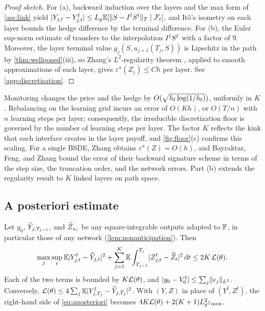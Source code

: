 \begin{proof}[Proof sketch]
For (a), backward induction over the layers and the max form of \cref{ass:link} yield $\lvert Y_{j,t}-Y^{\mathrm f}_{j,t}\rvert\le L_g\mathbb{E}[\lVert S-I^{\mathrm f} S^{\mathrm f}\rVert_T\mid\mathcal{F}_t]$, and It\^o's isometry on each layer bounds the hedge difference by the terminal difference. For (b), the Euler sup-norm estimate of \cite[Thm.~4.2]{zhang2004} transfers to the interpolation $I^{\mathrm f} S^{\mathrm f}$ with a factor of $9$. Moreover, the layer terminal value $g_j(S,u_{j+1}(T_j,S))$ is Lipschitz in the path by \cref{thm:wellposed}(iii), so Zhang's $L^2$-regularity theorem \cite{zhang2004}, applied to smooth approximations of each layer, gives $\varepsilon^\pi(Z_j)\le Ch$ per layer. See \cref{app:discretisation}.
\end{proof}

\begin{remark}\label{rem:discretisation}
Monitoring changes the price and the hedge by $O(\sqrt{h_{\mathrm f}\log(1/h_{\mathrm f})})$, uniformly in $K$. Rebalancing on the learning grid incurs an error of $O(Kh)$, or $O(T/n)$ with $n$ learning steps per layer; consequently, the irreducible discretization floor is governed by the number of learning steps per layer. The factor $K$ reflects the kink that each interface creates in the layer payoff, and \cref{fig:floor}(c) confirms this scaling. For a single BSDE, Zhang \cite{zhang2004} obtains $\varepsilon^\pi(Z)=O(h)$, and Bayraktar, Feng, and Zhang \cite{bayraktar2024} bound the error of their backward signature scheme in terms of the step size, the truncation order, and the network errors. Part (b) extends the regularity result to $K$ linked layers on path space.
\end{remark}

\subsection{A posteriori estimate}\label{sec:aposteriori}

\begin{theorem}\label{thm:aposteriori}
Let $y_0$, $\widehat Y_{j,T_{j-1}}$, and $\widehat Z_{u_i}$ be any square-integrable outputs adapted to $\mathbb{F}$, in particular those of any network (\cref{lem:nonanticipation}). Then
\begin{equation}\label{eq:aposteriori}
\max_j\sup_{t}\mathbb{E}\lvert Y^{\mathrm f}_{j,t}-\widehat Y_{j,t}\rvert^2+\sum_{j=1}^K\mathbb{E}\int_{T_{j-1}}^{T_j}\lvert Z^{\mathrm f}_{j,t}-\widehat Z_t\rvert^2\,\mathrm{d} t\le2K\,\mathcal{L}(\theta).
\end{equation}
Each of the two terms is bounded by $K\mathcal{L}(\theta)$, and $\lvert y_0-V^{\mathrm f}_0\rvert\le\sum_j\lVert e_j\rVert_{L^2}$. Conversely, $\mathcal{L}(\theta)\le4\sum_j\mathbb{E}\lvert Y^{\mathrm f}_{j,T_j}-\widehat Y_{j,T_j}\rvert^2$. With $(Y,Z)$ in place of $(Y^{\mathrm f},Z^{\mathrm f})$, the right-hand side of \eqref{eq:aposteriori} becomes $4K\mathcal{L}(\theta)+2(K+1)L_g^2\varepsilon_{\mathrm{mon}}$.
\end{theorem}

